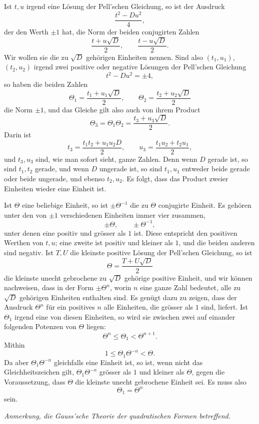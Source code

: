 \documentclass[11pt]{article}
\begin{document}
Ist $t,u$ irgend eine Lösung der Pell'schen Gleichung, so ist der Ausdruck
\[
        \frac{t^2-Du^2}{4},
\]
der den Werth $\pm1$ hat, die Norm der beiden conjugirten Zahlen
\[
        \frac{t+u\sqrt D}{2},\qquad \frac{t-u\sqrt D}{2}.
\]
Wir wollen sie die zu $\sqrt D$ gehörigen Einheiten nennen. Sind also $(t_1,u_1)$, $(t_2,u_2)$ irgend zwei positive oder negative Lösungen der Pell'schen Gleichung
\[
        t^2-Du^2=\pm4,
\]
so haben die beiden Zahlen
\[
        \Theta_1=\frac{t_1+u_1\sqrt D}{2},\qquad
        \Theta_2=\frac{t_2+u_2\sqrt D}{2}
\]
die Norm $\pm1$, und das Gleiche gilt also auch von ihrem Product
\[
        \Theta_3=\Theta_1\Theta_2=\frac{t_3+u_3\sqrt D}{2}.
\]
Darin ist
\[
        t_3=\frac{t_1t_2+u_1u_2D}{2},\qquad
        u_3=\frac{t_1u_2+t_2u_1}{2},
\]
und $t_3,u_3$ sind, wie man sofort sieht, ganze Zahlen. Denn wenn $D$ gerade ist, so sind $t_1,t_2$ gerade, und wenn $D$ ungerade ist, so sind $t_1,u_1$ entweder beide gerade oder beide ungerade, und ebenso $t_2,u_2$. Es folgt, dass das Product zweier Einheiten wieder eine Einheit ist.

Ist $\Theta$ eine beliebige Einheit, so ist $\pm\Theta^{-1}$ die zu $\Theta$ conjugirte Einheit. Es gehören unter den von $\pm1$ verschiedenen Einheiten immer vier zusammen,
\[
        \pm\Theta,\qquad \pm\Theta^{-1},
\]
unter denen eine positiv und grösser als $1$ ist. Diese entspricht den positiven Werthen von $t,u$; eine zweite ist positiv und kleiner als $1$, und die beiden anderen sind negativ. Ist $T,U$ die kleinste positive Lösung der Pell'schen Gleichung, so ist
\[
        \Theta=\frac{T+U\sqrt D}{2}
\]
die kleinste unecht gebrochene zu $\sqrt D$ gehörige positive Einheit, und wir können nachweisen, dass in der Form $\pm\Theta^n$, worin $n$ eine ganze Zahl bedeutet, alle zu $\sqrt D$ gehörigen Einheiten enthalten sind. Es genügt dazu zu zeigen, dass der Ausdruck $\Theta^n$ für ein positives $n$ alle Einheiten, die grösser als $1$ sind, liefert. Ist $\Theta_1$ irgend eine von diesen Einheiten, so wird sie zwischen zwei auf einander folgenden Potenzen von $\Theta$ liegen:
\[
        \Theta^n\le\Theta_1<\Theta^{n+1}.
\]
Mithin
\[
        1\le \Theta_1\Theta^{-n}<\Theta.
\]
Da aber $\Theta_1\Theta^{-n}$ gleichfalls eine Einheit ist, so ist, wenn nicht das Gleichheitszeichen gilt, $\Theta_1\Theta^{-n}$ grösser als $1$ und kleiner als $\Theta$, gegen die Voraussetzung, dass $\Theta$ die kleinste unecht gebrochene Einheit sei. Es muss also
\[
        \Theta_1=\Theta^n
\]
sein.

\begin{center}
\textit{Anmerkung, die Gauss'sche Theorie der quadratischen Formen betreffend.}
\end{center}
\end{document}

